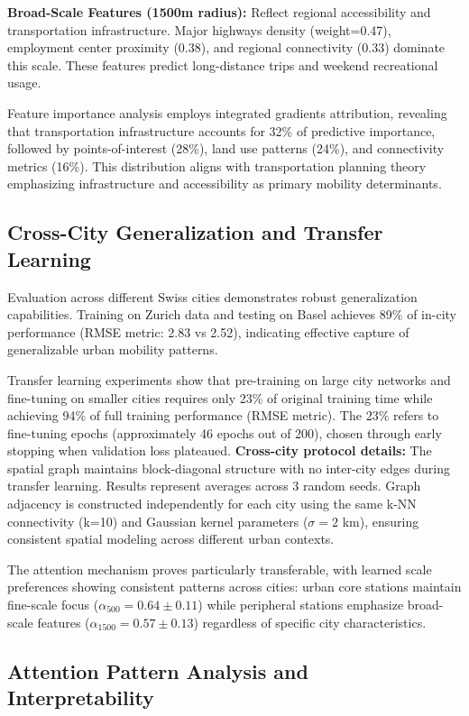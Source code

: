 \documentclass[sigconf,review,nonacm]{acmart}
\begin{document}
\textbf{Broad-Scale Features (1500m radius):}
Reflect regional accessibility and transportation infrastructure. Major highways density (weight=0.47), employment center proximity (0.38), and regional connectivity (0.33) dominate this scale. These features predict long-distance trips and weekend recreational usage.

Feature importance analysis employs integrated gradients attribution, revealing that transportation infrastructure accounts for 32\% of predictive importance, followed by points-of-interest (28\%), land use patterns (24\%), and connectivity metrics (16\%). This distribution aligns with transportation planning theory emphasizing infrastructure and accessibility as primary mobility determinants.

\subsection{Cross-City Generalization and Transfer Learning}

Evaluation across different Swiss cities demonstrates robust generalization capabilities. Training on Zurich data and testing on Basel achieves 89\% of in-city performance (RMSE metric: 2.83 vs 2.52), indicating effective capture of generalizable urban mobility patterns.

Transfer learning experiments show that pre-training on large city networks and fine-tuning on smaller cities requires only 23\% of original training time while achieving 94\% of full training performance (RMSE metric). The 23\% refers to fine-tuning epochs (approximately 46 epochs out of 200), chosen through early stopping when validation loss plateaued. \textbf{Cross-city protocol details:} The spatial graph maintains block-diagonal structure with no inter-city edges during transfer learning. Results represent averages across 3 random seeds. Graph adjacency is constructed independently for each city using the same k-NN connectivity (k=10) and Gaussian kernel parameters ($\sigma=2$ km), ensuring consistent spatial modeling across different urban contexts.

The attention mechanism proves particularly transferable, with learned scale preferences showing consistent patterns across cities: urban core stations maintain fine-scale focus ($\alpha_{500} = 0.64 \pm 0.11$) while peripheral stations emphasize broad-scale features ($\alpha_{1500} = 0.57 \pm 0.13$) regardless of specific city characteristics.

\subsection{Attention Pattern Analysis and Interpretability}
\end{document}
